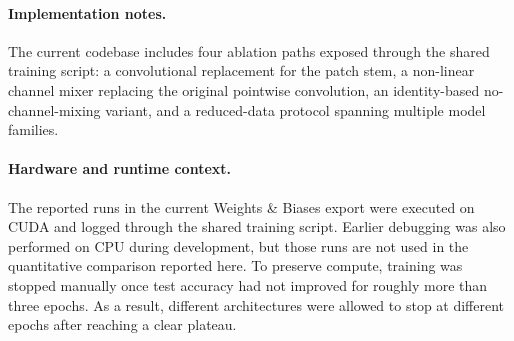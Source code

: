 \paragraph{Implementation notes.}
The current codebase includes four ablation paths exposed through the shared training script: a convolutional replacement for the patch stem, a non-linear channel mixer replacing the original pointwise convolution, an identity-based no-channel-mixing variant, and a reduced-data protocol spanning multiple model families.

\paragraph{Hardware and runtime context.}
The reported runs in the current Weights \& Biases export were executed on CUDA and logged through the shared training script. Earlier debugging was also performed on CPU during development, but those runs are not used in the quantitative comparison reported here. To preserve compute, training was stopped manually once test accuracy had not improved for roughly more than three epochs. As a result, different architectures were allowed to stop at different epochs after reaching a clear plateau.
